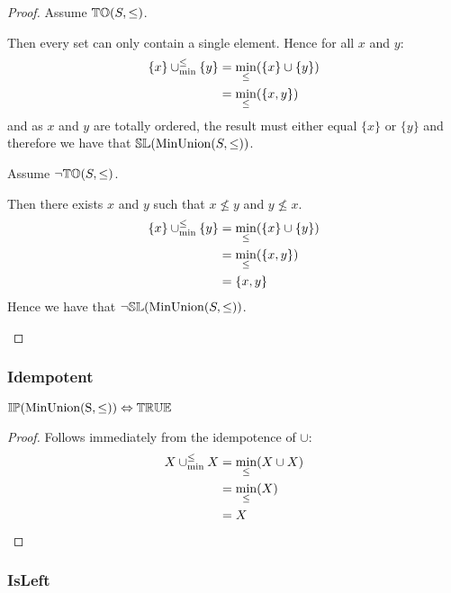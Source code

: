 \documentclass[../Summary.tex]{subfiles}
\begin{document}
\begin{proof}
Assume ${\mathbb{TO}}(S,\leq)$.

\begin{ind}
Then every set can only contain a single element. Hence for all $x$ and $y$:
\begin{align*}
\{ x \} \mathbin{\cup_{\min}^{\leq}} \{ y \} 	& = \min_\leq(\{ x \} \cup \{ y \}) \\
							& = \min_\leq(\{ x , y \}) 
\end{align*}
and as $x$ and $y$ are totally ordered, the result must either equal $\{ x \}$ or $\{ y \}$ and therefore we have that ${\mathbb{SL}}(\mathrm{MinUnion}(S,\leq))$.
\end{ind}

Assume $\neg {\mathbb{TO}}(S,\leq)$.

\begin{ind}
Then there exists $x$ and $y$ such that $x \nleq y$ and $y \nleq x$.
\begin{align*}
\{ x \} \mathbin{\cup_{\min}^{\leq}} \{ y \} 	& = \min_\leq(\{ x \} \cup \{ y \}) \\
							& = \min_\leq(\{ x , y \}) \\
							& = \{ x , y \}
\end{align*}
Hence we have that $\neg {\mathbb{SL}}(\mathrm{MinUnion}(S,\leq))$.
\end{ind}
\end{proof}




\subsubsection{Idempotent}

\begin{theorem} \label{thm:minunion_ip}
${\mathbb{IP}}(\mathrm{MinUnion(S,\leq)}) \Leftrightarrow {\mathbb{TRUE}}$
\end{theorem}

\begin{proof}
Follows immediately from the idempotence of $\cup$:
\begin{align*}
X \mathbin{\cup_{\min}^{\leq}} X 	& = \min_\leq(X \cup X) \\
				& = \min_\leq(X) \\
				& = X
\end{align*}
\end{proof}



\subsubsection{IsLeft}
\end{document}
